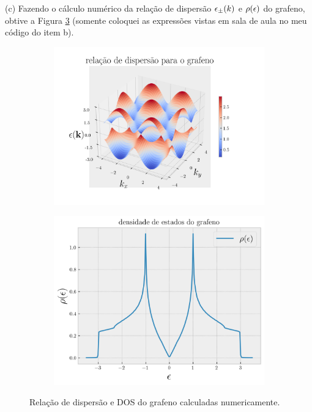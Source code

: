 \documentclass[a4paper,10pt]{article}
\begin{document}
(c) Fazendo o cálculo numérico da relação de dispersão $\epsilon_\pm(k)$ e $\rho(\epsilon)$ do grafeno, obtive a Figura \ref{fig:grafeno} (somente coloquei as expressões vistas em sala de aula no meu código do item b).
\begin{figure}[H]
\centering
\begin{subfigure}{.46\textwidth}
  \centering
  \includegraphics[width=1\linewidth]{fig/graphene_eps.png}
  \label{fig:graphene_eps}
\end{subfigure}
\begin{subfigure}{.43\textwidth}
  \centering
  \includegraphics[width=\linewidth]{fig/graphene_dos.png}
  \label{fig:graphene_dos}
\end{subfigure}
\caption{Relação de dispersão e DOS do grafeno calculadas numericamente.}
\label{fig:grafeno}
\end{figure}
\end{document}

